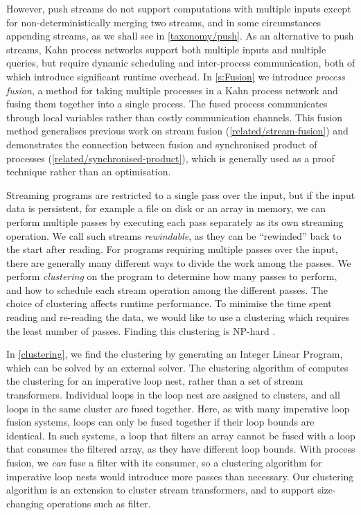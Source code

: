 However, push streams do not support computations with multiple inputs except for non-deterministically merging two streams, and in some circumstances appending streams, as we shall see in \cref{taxonomy/push}.
As an alternative to push streams, Kahn process networks support both multiple inputs and multiple queries, but require dynamic scheduling and inter-process communication, both of which introduce significant runtime overhead.
In \cref{s:Fusion} we introduce \emph{process fusion}, a method for taking multiple processes in a Kahn process network and fusing them together into a single process.
The fused process communicates through local variables rather than costly communication channels.
This fusion method generalises previous work on stream fusion (\cref{related/stream-fusion}) and demonstrates the connection between fusion and synchronised product of processes (\cref{related/synchronised-product}), which is generally used as a proof technique rather than an optimisation.

Streaming programs are restricted to a single pass over the input, but if the input data is persistent, for example a file on disk or an array in memory, we can perform multiple passes by executing each pass separately as its own streaming operation.
We call such streams \emph{rewindable}, as they can be ``rewinded'' back to the start after reading.
For programs requiring multiple passes over the input, there are generally many different ways to divide the work among the passes.
We perform \emph{clustering} on the program to determine how many passes to perform, and how to schedule each stream operation among the different passes.
The choice of clustering affects runtime performance.
To minimise the time spent reading and re-reading the data, we would like to use a clustering which requires the least number of passes.
Finding this clustering is NP-hard \cite{darte1999complexity}.

In \cref{clustering}, we find the clustering by generating an Integer Linear Program, which can be solved by an external solver.
The clustering algorithm of \citet{megiddo1998optimal} computes the clustering for an imperative loop nest, rather than a set of stream transformers.
Individual loops in the loop nest are assigned to clusters, and all loops in the same cluster are fused together.
Here, as with many imperative loop fusion systems, loops can only be fused together if their loop bounds are identical.
In such systems, a loop that filters an array cannot be fused with a loop that consumes the filtered array, as they have different loop bounds.
With process fusion, we \emph{can} fuse a filter with its consumer, so a clustering algorithm for imperative loop nests would introduce more passes than necessary.
Our clustering algorithm is an extension \citet{megiddo1998optimal} to cluster stream transformers, and to support size-changing operations such as filter.

